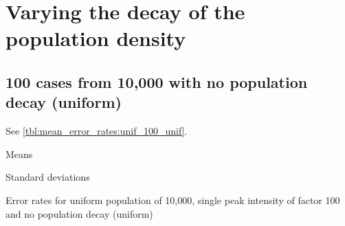 \section{Varying the decay of the population density}

\subsection{100 cases from 10,000 with no population decay (uniform)}

See \autoref{tbl:mean_error_rates:unif_100_unif}.

\begin{table}[H]
\centering
\scriptsize

    \begin{subtable}{0.5\textwidth}
    
    \caption{Means} 
    \end{subtable}%
    \begin{subtable}{0.5\textwidth}
    
    \caption{Standard deviations} 
    \end{subtable}

\caption{Error rates for uniform population of 10,000, single peak intensity of factor 100 and no population decay (uniform)}
\label{tbl:mean_error_rates:unif_100_unif:3}
\end{table}


%     
%     


